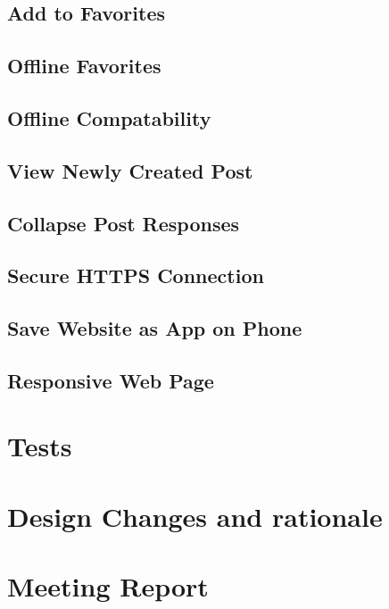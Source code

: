 \documentclass[12pt]{article}
\begin{document}
      \subsection{Add to Favorites}
      \subsection{Offline Favorites}
      \subsection{Offline Compatability}
      \subsection{View Newly Created Post}
      \subsection{Collapse Post Responses}
      \subsection{Secure HTTPS Connection}
      \subsection{Save Website as App on Phone}
      \subsection{Responsive Web Page}
\section{Tests}
\section{Design Changes and rationale}
\section{Meeting Report}
\end{document}

